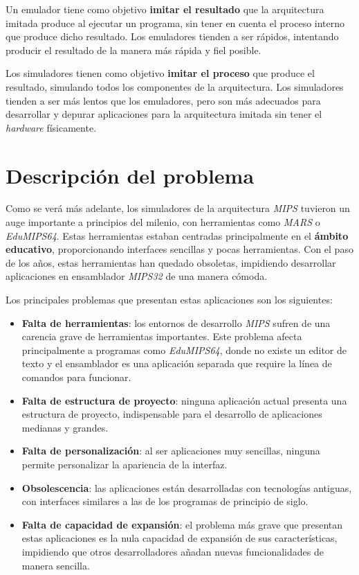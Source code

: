 Un emulador tiene como objetivo \textbf{imitar el resultado}
que la arquitectura imitada produce al ejecutar un programa, sin tener
en cuenta el proceso interno que produce dicho resultado.
Los emuladores tienden a ser rápidos, intentando producir el resultado
de la manera más rápida y fiel posible.

Los simuladores tienen como objetivo \textbf{imitar el proceso}
que produce el resultado, simulando todos los componentes de la arquitectura.
Los simuladores tienden a ser más lentos que los emuladores, pero son más
adecuados para desarrollar y depurar aplicaciones para la arquitectura
imitada sin tener el \textit{hardware} físicamente.


\section{Descripción del problema}\label{sec:descripcion-del-problema}

Como se verá más adelante, los simuladores de la arquitectura \textit{MIPS} tuvieron
un auge importante a principios del milenio, con herramientas como \textit{MARS}\cite{MARS}
o \textit{EduMIPS64}\cite{EDUMIPS64}.
Estas herramientas estaban centradas principalmente en el \textbf{ámbito educativo}, proporcionando
interfaces sencillas y pocas herramientas.
Con el paso de los años, estas herramientas han quedado obsoletas, impidiendo desarrollar aplicaciones
en ensamblador \textit{MIPS32} de una manera cómoda.

Los principales problemas que presentan estas aplicaciones son los siguientes:
\begin{itemize}
    \item \textbf{Falta de herramientas}: los entornos de desarrollo \textit{MIPS} sufren de una
    carencia grave de herramientas importantes.
    Este problema afecta principalmente a programas como \textit{EduMIPS64}, donde no existe un editor de texto y
    el ensamblador es una aplicación separada que require la línea de comandos para funcionar.
    \item \textbf{Falta de estructura de proyecto}: ninguna aplicación actual presenta una estructura
    de proyecto, indispensable para el desarrollo de aplicaciones medianas y grandes.
    \item \textbf{Falta de personalización}: al ser aplicaciones muy sencillas, ninguna permite
    personalizar la apariencia de la interfaz.
    \item \textbf{Obsolescencia}: las aplicaciones están desarrolladas con tecnologías antiguas,
    con interfaces similares a las de los programas de principio de siglo.
    \item \textbf{Falta de capacidad de expansión}: el problema más grave que presentan estas aplicaciones
    es la nula capacidad de expansión de sus características, impidiendo que otros desarrolladores
    añadan nuevas funcionalidades de manera sencilla.
\end{itemize}



